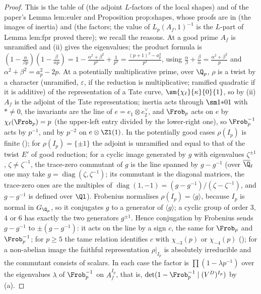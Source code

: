 \begin{proof}
This is the table of  (the adjoint $L$-factors of the local shapes) and of the paper's Lemma lem:euler and Proposition prop:shapes, whose
proofs are in  (the images of inertia) and  (the factors; the value of $L_p(A_f,1)^{-1}$ is the $L$-part of Lemma lem:fpr proved
there); we recall the reasons. At a good prime $A_f$ is unramified
and (ii) gives the eigenvalues; the product formula is
$(1-\frac\alpha{\beta p})(1-\frac\beta{\alpha p})=1-\frac{\alpha^2+\beta^2}{p^2}+\frac1{p^2}=\frac{(p+1)^2-a_p^2}{p^2}$, using $\frac\alpha\beta+\frac\beta\alpha=\frac{\alpha^2+\beta^2}{p}$ and
$\alpha^2+\beta^2=a_p^2-2p$. At a potentially multiplicative prime, over $\Q_p$, $\rho$ is a
twist by a character (unramified, $\varepsilon$, if the reduction is multiplicative; ramified quadratic if it is additive) of the representation of a Tate curve,
$\sm{\chi_\ell}{\kappa}{0}{1}$, so by (ii) $A_f$ is the adjoint of the Tate representation; inertia acts through
$\sm1{*}01$ with $*\ne0$, the invariants are the line of $e=e_1\otimes e_2^\vee$, and $\Frob_p$ acts on $e$ by $\chi_\ell(\Frob_p)=p$ (the upper-left entry divided by the
lower-right one), so $\Frob_p^{-1}$ acts by $p^{-1}$, and by $p^{-2}$ on $e\otimes\Zl(1)$. In the potentially good cases $\rho(I_p)$ is finite (); for
$\rho(I_p)=\{\pm1\}$ the adjoint is unramified and equal to that of the twist $E'$ of good reduction; for a cyclic image generated by $g$ with eigenvalues
$\zeta^{\pm1}$, $\zeta\ne\zeta^{-1}$, the trace-zero commutant of $g$ is the line spanned by $g-g^{-1}$ (over $\overline\Q_\ell$ one may take $g=\operatorname{diag}(\zeta,\zeta^{-1})$; its
commutant is the diagonal matrices, the trace-zero ones are the multiples of $\operatorname{diag}(1,-1)=(g-g^{-1})/(\zeta-\zeta^{-1})$, and $g-g^{-1}$ is defined over $\Ql$). Frobenius
normalises $\rho(I_p)=\langle g\rangle$, because $I_p$ is normal in $G_{\Q_p}$, so it conjugates $g$ to a generator of $\langle g\rangle$; a cyclic group of order $3$, $4$ or $6$ has exactly
the two generators $g^{\pm1}$. Hence conjugation by Frobenius sends $g-g^{-1}$ to $\pm(g-g^{-1})$: it acts on the line by a sign $c$, the same for $\Frob_p$ and $\Frob_p^{-1}$; for $p\ge5$ the tame relation identifies $c$ with $\chi_{-3}(p)$ or
$\chi_{-4}(p)$ (); for a non-abelian image the faithful representation $\rho|_{I_p}$ is absolutely irreducible and the commutant consists of scalars. In each
case the factor is $\prod(1-\lambda p^{-1})$ over the eigenvalues $\lambda$ of $\Frob_p^{-1}$ on $A_f^{I_p}$, that is, $\det(1-\Frob_p^{-1}\mid(V^D)^{I_p})$ by
(a).
\end{proof}

